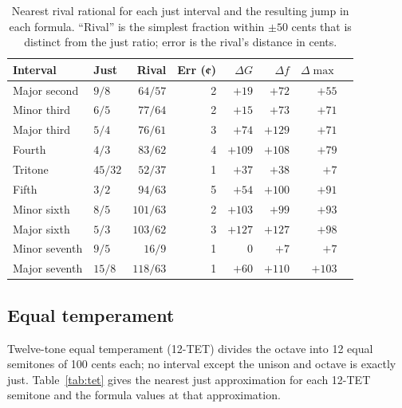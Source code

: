 \documentclass[11pt,a4paper]{article}
\begin{document}
\begin{table}[h]
\centering
\caption{Nearest rival rational for each just interval and the resulting jump
in each formula. ``Rival'' is the simplest fraction within $\pm 50$ cents
that is distinct from the just ratio; error is the rival's distance in cents.}
\label{tab:rivals}
\smallskip
\begin{tabular}{llrrrrrr}
\toprule
Interval & Just & Rival & Err (¢) & $\Delta G$ & $\Delta f$ & $\Delta \max$ \\
\midrule
Major second  & $9/8$   & $64/57$  & 2 & $+19$ & $+72$  & $+55$ \\
Minor third   & $6/5$   & $77/64$  & 2 & $+15$ & $+73$  & $+71$ \\
Major third   & $5/4$   & $76/61$  & 3 & $+74$ & $+129$ & $+71$ \\
Fourth        & $4/3$   & $83/62$  & 4 & $+109$& $+108$ & $+79$ \\
Tritone       & $45/32$ & $52/37$  & 1 & $+37$ & $+38$  & $+7$  \\
Fifth         & $3/2$   & $94/63$  & 5 & $+54$ & $+100$ & $+91$ \\
Minor sixth   & $8/5$   & $101/63$ & 2 & $+103$& $+99$  & $+93$ \\
Major sixth   & $5/3$   & $103/62$ & 3 & $+127$& $+127$ & $+98$ \\
Minor seventh & $9/5$   & $16/9$   & 1 & $0$   & $+7$   & $+7$  \\
Major seventh & $15/8$  & $118/63$ & 1 & $+60$ & $+110$ & $+103$ \\
\bottomrule
\end{tabular}
\end{table}

\subsection*{Equal temperament}

Twelve-tone equal temperament (12-TET) divides the octave into 12 equal
semitones of 100 cents each; no interval except the unison and octave is
exactly just. Table~\ref{tab:tet} gives the nearest just approximation for
each 12-TET semitone and the formula values at that approximation.
\end{document}
